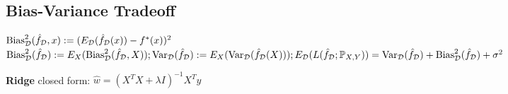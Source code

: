 \subsection*{Bias-Variance Tradeoff}
\(\text{Bias}_{\mathcal{D}}^2(\hat{f}_{\mathcal{D}}, x) := (E_{\mathcal{D}}(\hat{f}_{\mathcal{D}}(x))-f^*(x))^2\)\\
\(\text{Bias}^2_{\mathcal{D}}(\hat{f}_{\mathcal{D}}) := E_X(\text{Bias}_{\mathcal{D}}^2(\hat{f}_{\mathcal{D}}, X));
\text{Var}_{\mathcal{D}}(\hat{f}_{\mathcal{D}}) := E_X(\text{Var}_{\mathcal{D}}(\hat{f}_{\mathcal{D}}(X))); 
E_{\mathcal{D}}(L(\hat{f}_{\mathcal{D}}; \mathbb{P}_{X,Y})) = \text{Var}_{\mathcal{D}}(\hat{f}_{\mathcal{D}})+\text{Bias}_{\mathcal{D}}^2(\hat{f}_{\mathcal{D}})+\sigma^2\)

\textbf{Ridge} closed form: $\hat{w}=(X^T X + \lambda I)^{-1} X^T y$







